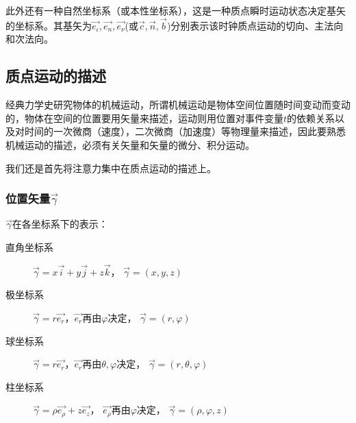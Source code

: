 此外还有一种自然坐标系（或本性坐标系），这是一种质点瞬时运动状态决定基矢的坐标系。其基矢为$\vec{e_\iota},\vec{e_n},\vec{e_\nu}$(或$\vec{c},\vec{n},\vec{b}$)分别表示该时钟质点运动的切向、主法向和次法向。

\subsection{质点运动的描述}
经典力学史研究物体的机械运动，所谓机械运动是物体空间位置随时间变动而变动的，物体在空间的位置要用矢量来描述，运动则用位置对事件变量$t$的依赖关系以及对时间的一次微商（速度），二次微商（加速度）等物理量来描述，因此要熟悉机械运动的描述，必须有关矢量和矢量的微分、积分运动。

我们还是首先将注意力集中在质点运动的描述上。

\subsubsection{位置矢量$\vec{\gamma}$}
$\vec{\gamma}$在各坐标系下的表示：\begin{description}
\item[直角坐标系]
	$\vec{\gamma}=x\vec{i}+y\vec{j}+z\vec{k}$，
	$\vec{\gamma}=(x,y,z)$
\item[极坐标系]
	$\vec{\gamma}=r\vec{e_r}$，$\vec{e_r}$再由$\varphi$决定，
	$\vec{\gamma}=(r,\varphi)$
\item[球坐标系]
	$\vec{\gamma}=r\vec{e_r}$，$\vec{e_r}$再由$\theta,\varphi$决定，
	$\vec{\gamma}=(r,\theta,\varphi)$
\item[柱坐标系]
	$\vec{\gamma}=\rho\vec{e_\rho}+z\vec{e_z}$，
	$\vec{e_\rho}$再由$\varphi$决定，
	$\vec{\gamma}=(\rho,\varphi,z)$
\end{description}


